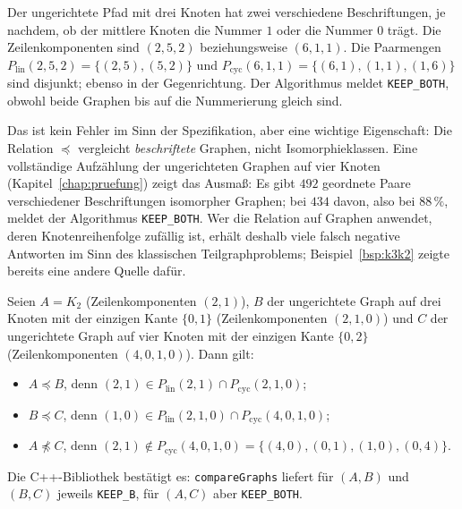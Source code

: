 \begin{beispiel}
	\label{bsp:nummerierung}
	Der ungerichtete Pfad mit drei Knoten hat zwei verschiedene Beschriftungen, je nachdem, ob der mittlere Knoten die Nummer $1$ oder die Nummer $0$ trägt. Die Zeilenkomponenten sind $(2,5,2)$ beziehungsweise $(6,1,1)$. Die Paarmengen $P_{\mathrm{lin}}(2,5,2)=\{(2,5),(5,2)\}$ und $P_{\mathrm{cyc}}(6,1,1)=\{(6,1),(1,1),(1,6)\}$ sind disjunkt; ebenso in der Gegenrichtung. Der Algorithmus meldet \texttt{KEEP\_BOTH}, obwohl beide Graphen bis auf die Nummerierung gleich sind.
\end{beispiel}

Das ist kein Fehler im Sinn der Spezifikation, aber eine wichtige Eigenschaft: Die Relation $\preceq$ vergleicht \emph{beschriftete} Graphen, nicht Isomorphieklassen. Eine vollständige Aufzählung der ungerichteten Graphen auf vier Knoten (Kapitel~\ref{chap:pruefung}) zeigt das Ausmaß: Es gibt $492$ geordnete Paare verschiedener Beschriftungen isomorpher Graphen; bei $434$ davon, also bei $88\,\%$, meldet der Algorithmus \texttt{KEEP\_BOTH}. Wer die Relation auf Graphen anwendet, deren Knotenreihenfolge zufällig ist, erhält deshalb viele \glqq falsch negative\grqq{} Antworten im Sinn des klassischen Teilgraphproblems; Beispiel~\ref{bsp:k3k2} zeigte bereits eine andere Quelle dafür.

\begin{beispiel}
	\label{bsp:transitiv}
	Seien $A=K_2$ (Zeilenkomponenten $(2,1)$), $B$ der ungerichtete Graph auf drei Knoten mit der einzigen Kante $\{0,1\}$ (Zeilenkomponenten $(2,1,0)$) und $C$ der ungerichtete Graph auf vier Knoten mit der einzigen Kante $\{0,2\}$ (Zeilenkomponenten $(4,0,1,0)$). Dann gilt:
	\begin{itemize}
		\item $A\preceq B$, denn $(2,1)\in P_{\mathrm{lin}}(2,1)\cap P_{\mathrm{cyc}}(2,1,0)$;
		\item $B\preceq C$, denn $(1,0)\in P_{\mathrm{lin}}(2,1,0)\cap P_{\mathrm{cyc}}(4,0,1,0)$;
		\item $A\not\preceq C$, denn $(2,1)\notin P_{\mathrm{cyc}}(4,0,1,0)=\{(4,0),(0,1),(1,0),(0,4)\}$.
	\end{itemize}
	Die C++-Bibliothek bestätigt es: \texttt{compareGraphs} liefert für $(A,B)$ und $(B,C)$ jeweils \texttt{KEEP\_B}, für $(A,C)$ aber \texttt{KEEP\_BOTH}.
\end{beispiel}

